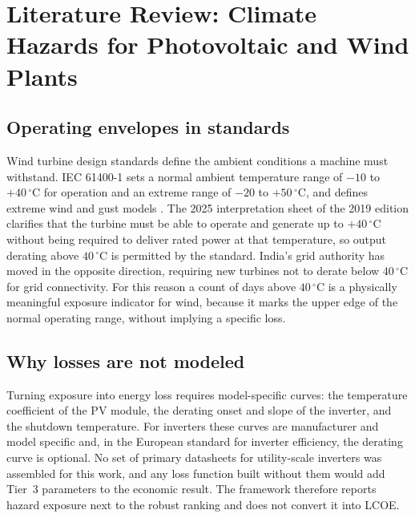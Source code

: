 
\section{Literature Review: Climate Hazards for Photovoltaic and Wind Plants}
\label{sec:g5-lit}

\subsection{Operating envelopes in standards}
Wind turbine design standards define the ambient conditions a machine must withstand. IEC 61400-1 sets a normal ambient temperature range of $-10$ to $+40\,^{\circ}\mathrm{C}$ for operation and an extreme range of $-20$ to $+50\,^{\circ}\mathrm{C}$, and defines extreme wind and gust models \citep{iec61400}. The 2025 interpretation sheet of the 2019 edition clarifies that the turbine must be able to operate and generate up to $+40\,^{\circ}\mathrm{C}$ without being required to deliver rated power at that temperature, so output derating above $40\,^{\circ}\mathrm{C}$ is permitted by the standard. %
India's grid authority has moved in the opposite direction, requiring new turbines not to derate below $40\,^{\circ}\mathrm{C}$ for grid connectivity. %
For this reason a count of days above $40\,^{\circ}\mathrm{C}$ is a physically meaningful exposure indicator for wind, because it marks the upper edge of the normal operating range, without implying a specific loss.

\subsection{Why losses are not modeled}
Turning exposure into energy loss requires model-specific curves: the temperature coefficient of the PV module, the derating onset and slope of the inverter, and the shutdown temperature. For inverters these curves are manufacturer and model specific and, in the European standard for inverter efficiency, the derating curve is optional. %
No set of primary datasheets for utility-scale inverters was assembled for this work, and any loss function built without them would add Tier~3 parameters to the economic result. The framework therefore reports hazard exposure next to the robust ranking and does not convert it into LCOE.

